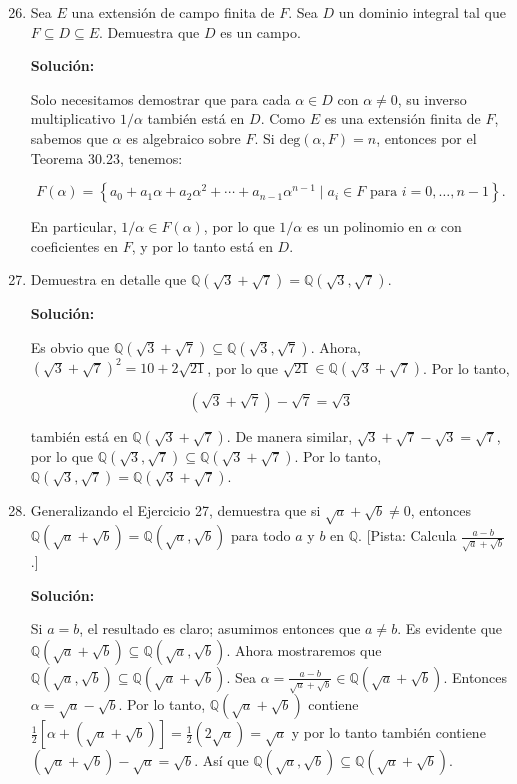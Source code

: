 \begin{enumerate}
    \setcounter{enumi}{25}
    
    \item Sea $E$ una extensión de campo finita de $F$. Sea $D$ un dominio integral tal que $F \subseteq D \subseteq E$. Demuestra que $D$ es un campo.
    
    \textbf{Solución:}
    
    Solo necesitamos demostrar que para cada $\alpha \in D$ con $\alpha \neq 0$, su inverso multiplicativo $1/\alpha$ también está en $D$. Como $E$ es una extensión finita de $F$, sabemos que $\alpha$ es algebraico sobre $F$. Si $\text{deg}(\alpha, F) = n$, entonces por el Teorema 30.23, tenemos:
    
    \[ F(\alpha) = \left\{ a_0 + a_1 \alpha + a_2 \alpha^2 + \cdots + a_{n-1} \alpha^{n-1} \mid a_i \in F \text{ para } i = 0, \dots, n-1 \right\}. \]
    
    En particular, $1/\alpha \in F(\alpha)$, por lo que $1/\alpha$ es un polinomio en $\alpha$ con coeficientes en $F$, y por lo tanto está en $D$.
    
    \item Demuestra en detalle que $\mathbb{Q}(\sqrt{3} + \sqrt{7}) = \mathbb{Q}(\sqrt{3}, \sqrt{7})$.
    
    \textbf{Solución:}
    
    Es obvio que $\mathbb{Q}(\sqrt{3} + \sqrt{7}) \subseteq \mathbb{Q}(\sqrt{3}, \sqrt{7})$. Ahora, $(\sqrt{3} + \sqrt{7})^2 = 10 + 2 \sqrt{21}$, por lo que $\sqrt{21} \in \mathbb{Q}(\sqrt{3} + \sqrt{7})$. Por lo tanto,
    
    \[ (\sqrt{3} + \sqrt{7}) - \sqrt{7} = \sqrt{3} \]
    
    también está en $\mathbb{Q}(\sqrt{3} + \sqrt{7})$. De manera similar, $\sqrt{3} + \sqrt{7} - \sqrt{3} = \sqrt{7}$, por lo que $\mathbb{Q}(\sqrt{3}, \sqrt{7}) \subseteq \mathbb{Q}(\sqrt{3} + \sqrt{7})$. Por lo tanto, $\mathbb{Q}(\sqrt{3}, \sqrt{7}) = \mathbb{Q}(\sqrt{3} + \sqrt{7})$.
    
    \item Generalizando el Ejercicio 27, demuestra que si $\sqrt{a} + \sqrt{b} \neq 0$, entonces $\mathbb{Q}(\sqrt{a} + \sqrt{b}) = \mathbb{Q}(\sqrt{a}, \sqrt{b})$ para todo $a$ y $b$ en $\mathbb{Q}$. [Pista: Calcula $\frac{a - b}{\sqrt{a} + \sqrt{b}}$.]
    
    \textbf{Solución:}
    
    Si $a = b$, el resultado es claro; asumimos entonces que $a \neq b$. Es evidente que $\mathbb{Q}(\sqrt{a} + \sqrt{b}) \subseteq \mathbb{Q}(\sqrt{a}, \sqrt{b})$. Ahora mostraremos que $\mathbb{Q}(\sqrt{a}, \sqrt{b}) \subseteq \mathbb{Q}(\sqrt{a} + \sqrt{b})$. Sea $\alpha = \frac{a - b}{\sqrt{a} + \sqrt{b}} \in \mathbb{Q}(\sqrt{a} + \sqrt{b})$. Entonces $\alpha = \sqrt{a} - \sqrt{b}$. Por lo tanto, $\mathbb{Q}(\sqrt{a} + \sqrt{b})$ contiene $\frac{1}{2}[\alpha + (\sqrt{a} + \sqrt{b})] = \frac{1}{2} (2\sqrt{a}) = \sqrt{a}$ y por lo tanto también contiene $(\sqrt{a} + \sqrt{b}) - \sqrt{a} = \sqrt{b}$. Así que $\mathbb{Q}(\sqrt{a}, \sqrt{b}) \subseteq \mathbb{Q}(\sqrt{a} + \sqrt{b})$.
    

\end{enumerate}
